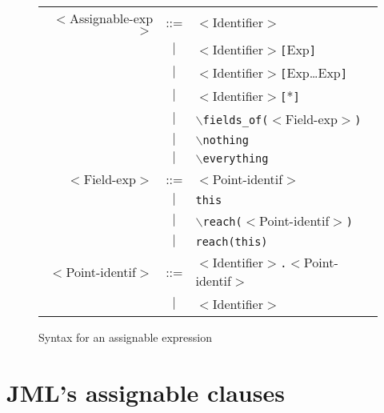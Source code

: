 \documentclass[a4paper]{llncs}
\begin{document}
\begin{figure}[tbh]
\begin{tabular}{rcl}

$<$\textsf{Assignable-exp}$>$  
  & ::=  & $<$\textsf{Identifier}$>$ \\
  &$\mid$& $<$\textsf{Identifier}$>$\texttt{[}\textsf{Exp}\texttt{]} \\
  &$\mid$& $<$\textsf{Identifier}$>$\texttt{[}\textsf{Exp}\ldots \textsf{Exp}\texttt{]}  \\
  &$\mid$& $<$\textsf{Identifier}$>$\texttt{[}*\texttt{]} \\
  &$\mid$& $\backslash$\texttt{fields\_of(}$<$\textsf{Field-exp}$>$\texttt{)}  \\
  &$\mid$& $\backslash$\texttt{nothing} \\
  &$\mid$& $\backslash$\texttt{everything} \\

$<$\textsf{Field-exp}$>$ 
  & ::=  & $<$\textsf{Point-identif}$>$  \\
  &$\mid$& \texttt{this} \\
  &$\mid$& $\backslash$\texttt{reach(}$<$\textsf{Point-identif}$>$\texttt{)}  \\
  &$\mid$& \texttt{reach(}\texttt{this}\texttt{)}  \\

$<$\textsf{Point-identif}$>$   
  & ::=  & $<$\textsf{Identifier}$>$\texttt{.}$<$\textsf{Point-identif}$> $ \\
  &$\mid$ & $<$\textsf{Identifier}$>$ \\
\end{tabular}
\caption{Syntax for an assignable expression}\label{FigAssignableExpr}
\end{figure}


\section{JML's assignable clauses}
\label{sec-ass}
\end{document}
